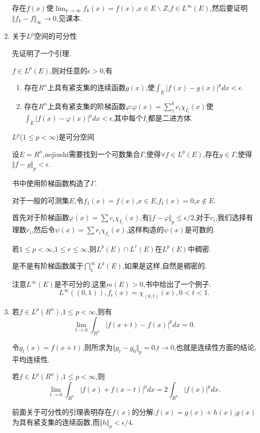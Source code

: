 \documentclass[12pt,a4paper,openany]{book}
\begin{document}
\begin{enumerate}
存在$f(x)$使$\lim_{k \rightarrow \infty}{f_k(x)}=f(x)$,$x \in E \backslash Z$,$f \in L^{\infty}(E)$,然后要证明$\Vert{f_k-f}\Vert_{\infty} \rightarrow 0$,见课本.

\item 关于$L^p$空间的可分性

先证明了一个引理.

$f \in L^p(E)$,则对任意的$\epsilon>0$,有
\begin{enumerate}
\item 存在$R^n$上具有紧支集的连续函数$g(x)$,使$\int_{E}{|f(x)-g(x)|^pdx}<\epsilon$.
\item 存在$R^n$上具有紧支集的阶梯函数$\varphi$:$\varphi(x)=\sum_{1}^{k}{c_i\chi_{I_i}(x)}$使$\int_{E}{|f(x)-\varphi(x)|^pdx}<\epsilon$,其中每个$I_i$都是二进方体.
\end{enumerate}

$L^p$($1 \le p < \infty$)是可分空间

设$E=R^n$,uejiushi需要找到一个可数集合$\Gamma$,使得$\forall f \in L^p(E)$,存在$g \in \Gamma$,使得$\Vert{f-g}\Vert_p<\epsilon$.

书中使用阶梯函数构造了$\Gamma$.

对于一般的可测集$E$,令$f_1(x)=f(x)$,$x \in E$,$f_1(x)=0$,$x \notin E$.

首先对于阶梯函数$\varphi(x)=\sum{c_i\chi_{I_i}(x)}$,有$\Vert{f-\varphi}\Vert_p \le \epsilon/2$,对于$c_i$,我们选择有理数$r_i$,然后令$\psi(x)=\sum{r_i\chi_{I_i}(x)}$,这样构造的$\psi(x)$是可数的.

若$1 \le p <\infty$,$1 \le r \le \infty$,则$L^p(E) \cap L^r(E)$在$L^p(E)$中稠密.

是不是有阶梯函数属于$\bigcap_{1}^{\infty}{L^k(E)}$,如果是这样,自然是稠密的.

注意$L^{\infty}(E)$是不可分的,这里$m(E)>0$,书中给出了一个例子.
\[
L^{\infty}((0,1)),f_t(x)=\chi_{(0,t)}(x),0<t<1.
\]

\item 若$f \in L^p(R^n)$,$1 \le p < \infty$,则有
\[
\lim_{t \rightarrow 0}{\int_{R^n}{|f(x+t)-f(x)|^pdx}} = 0.
\]

令$g_t(x)=f(x+t)$,则所求为$\Vert{g_t-g_0}\Vert_p=0$,$t \rightarrow 0$,也就是连续性方面的结论,平均连续性.

若$f \in L^p(R^n)$,$1 \le p < \infty$,则
\[
\lim_{t \rightarrow 0}{\int_{R^n}{|f(x)+f(x-t)|^pdx}}=2\int_{R^n}{|f(x)|^pdx}.
\]

前面关于可分性的引理表明存在$f(x)$的分解:$f(x)=g(x)+h(x)$,$g(x)$为具有紧支集的连续函数,而$\Vert{h}\Vert_p<\epsilon/4$.


\end{enumerate}
\end{document}
